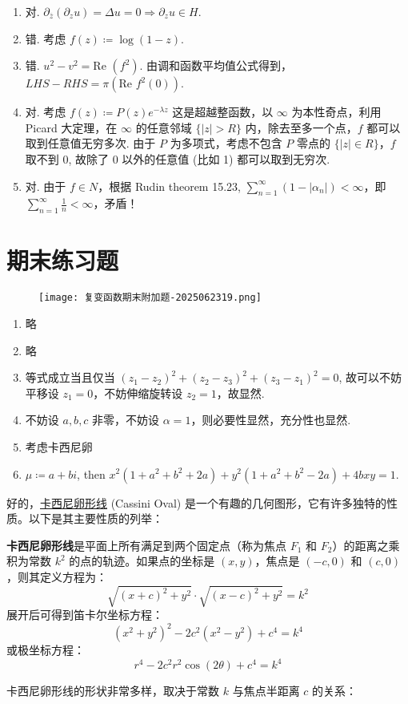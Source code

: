 \begin{enumerate}
	\item 对. $\partial_{\overline{z}}(\partial_{z}u)=\Delta u=0\Rightarrow \partial_{z}u\in H$.
	\item 错. 考虑 $f(z)\coloneqq\log(1-z)$.
	\item 错. $u^{2}-v^{2}=\text{Re }(f^{2})$. 由调和函数平均值公式得到，$LHS-RHS=\pi(\text{Re }f^{2}(0))$.
	\item 对. 考虑 $f(z)\coloneqq P(z)e^{ -\lambda z }$ 这是超越整函数，以 $\infty$ 为本性奇点，利用 Picard 大定理，在 $\infty$ 的任意邻域 $\{ \lvert z \rvert>R \}$ 内，除去至多一个点，$f$ 都可以取到任意值无穷多次. 由于 $P$ 为多项式，考虑不包含 $P$ 零点的 $\{ \lvert z \rvert\in R \}$，$f$ 取不到 0, 故除了 0 以外的任意值 (比如 1) 都可以取到无穷次.
	\item 对. 由于 $f\in N$，根据 Rudin theorem 15.23, $\sum_{n=1}^{\infty}(1-\lvert \alpha _n \rvert)<\infty$，即 $\sum_{n=1}^{\infty}\frac{1}{n}<\infty$，矛盾！
\end{enumerate}

\section{期末练习题}

\begin{figure}[H]
\centering
\texttt{[image: 复变函数期末附加题-2025062319.png]}
\label{}
\end{figure}

\begin{enumerate}
	\item 略
	\item 略
	\item 等式成立当且仅当 $(z_1-z_2)^{2}+(z_2-z_3)^{2}+(z_3-z_1)^{2}=0$, 故可以不妨平移设 $z_1=0$，不妨伸缩旋转设 $z_2=1$，故显然.
	\item 不妨设 $a,b,c$ 非零，不妨设 $\alpha=1$，则必要性显然，充分性也显然.
	\item 考虑卡西尼卵
	\item $\mu\coloneqq a+bi$, then $x^2\left(1+a^2+b^2+2 a\right)+y^2\left(1+a^2+b^2-2 a\right)+4 b x y=1$.
\end{enumerate}

好的，\underline{卡西尼卵形线} (Cassini Oval) 是一个有趣的几何图形，它有许多独特的性质。以下是其主要性质的列举：

\begin{definition}
\textbf{卡西尼卵形线}是平面上所有满足到两个固定点（称为焦点 $F_1$ 和 $F_2$）的距离之乘积为常数 $k^2$ 的点的轨迹。如果点的坐标是 $(x, y)$，焦点是 $(-c, 0)$ 和 $(c, 0)$，则其定义方程为：
\[
\sqrt{(x+c)^2 + y^2} \cdot \sqrt{(x-c)^2 + y^2} = k^2
\]展开后可得到笛卡尔坐标方程：
\[
(x^2 + y^2)^2 - 2c^2(x^2 - y^2) + c^4 = k^4
\]或极坐标方程：
\[
r^4 - 2c^2 r^2 \cos(2\theta) + c^4 = k^4
\]
\end{definition}
卡西尼卵形线的形状非常多样，取决于常数 $k$ 与焦点半距离 $c$ 的关系：

